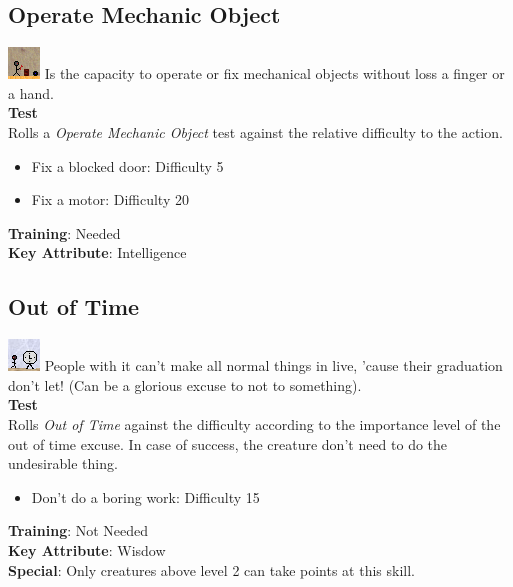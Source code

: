 \documentclass[ letterpaper,12pt]{article}
\begin{document}
\subsection{Operate Mechanic Object}
\includegraphics{../data/skills/Img/opobjmec.png}
Is the capacity to operate or fix mechanical objects without loss a finger or a hand.\\
{\bf Test}\\
Rolls a {\it Operate Mechanic Object} test against the relative difficulty to the action.\\
\begin{itemize}
\item{Fix a blocked door: Difficulty 5}
\item{Fix a motor: Difficulty 20}
\end{itemize}
{\bf Training}: Needed\\
{\bf Key Attribute}: Intelligence\\

\subsection{Out of Time}
\includegraphics{../data/skills/Img/semtempo.png}
People with it can't make all normal things in live, 'cause their graduation don't let! (Can be a glorious excuse to not to something).\\
{\bf Test}\\
Rolls {\it Out of Time} against the difficulty according to the importance level of the out of time excuse. In case of success, the creature don't need to do the undesirable thing.\\
\begin{itemize}
\item{Don't do a boring work: Difficulty 15}
\end{itemize}
{\bf Training}: Not Needed\\
{\bf Key Attribute}: Wisdow\\
{\bf Special}: Only creatures above level 2 can take points at this skill.\\
\end{document}
